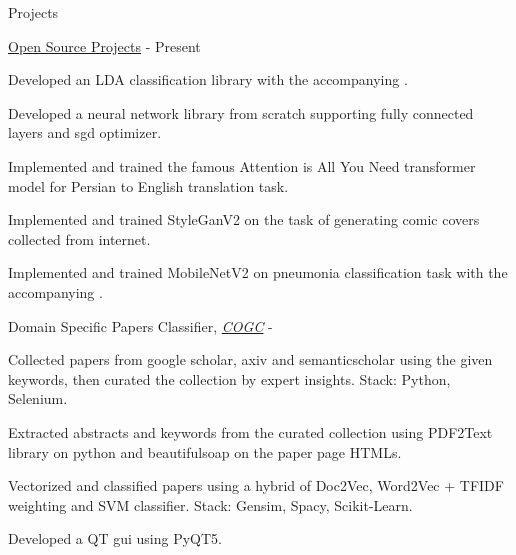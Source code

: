 \documentclass[../professional-cv.tex]{subfiles}
\begin{document}
	\begin{rSection}{Projects}
		
		\begin{rSubsection}
			{\href{https://github.com/FeryET}{Open Source Projects}}
			{  - Present }
			{}{}
			
			\item Developed an LDA classification library with the accompanying . \href{https://github.com/FeryET/lda_classification}{\faGithub}
			\item Developed a neural network library from scratch supporting fully connected layers and sgd optimizer. \href{https://github.com/FeryET/scratch_nn_lib}{\faGithub}
			\item Implemented and trained the famous Attention is All You Need transformer model for Persian to English translation task. \href{https://github.com/FeryET/persian-to-english-transformer}{\faGithub}
			\item Implemented and trained StyleGanV2 on the task of generating comic covers collected from internet. \href{https://github.com/FeryET/comic-cover-generator}{\faGithub}
			\item Implemented and trained MobileNetV2 on pneumonia classification task with the accompanying . \href{https://github.com/FeryET/pneumonia_analysis}{\faGithub}
			
			
			
		\end{rSubsection}
		
		\begin{rSubsection}
			{Domain Specific Papers Classifier, \em{\href{https://cogc.ir/}{COGC}}}
			{  - \fmtdate{10}{2018} }
			{}{}
			
			\item Collected papers from google scholar, axiv and semanticscholar using the given keywords, then curated the collection by expert insights. Stack: Python, Selenium.
			\item Extracted abstracts and keywords from the curated collection using PDF2Text library on python and beautifulsoap on the paper page HTMLs.
			\item Vectorized and classified papers using a hybrid of Doc2Vec, Word2Vec + TFIDF weighting and SVM classifier. Stack: Gensim, Spacy, Scikit-Learn.
			\item Developed a QT gui using PyQT5.
			
		\end{rSubsection}
		
		
	\end{rSection}
\end{document}
